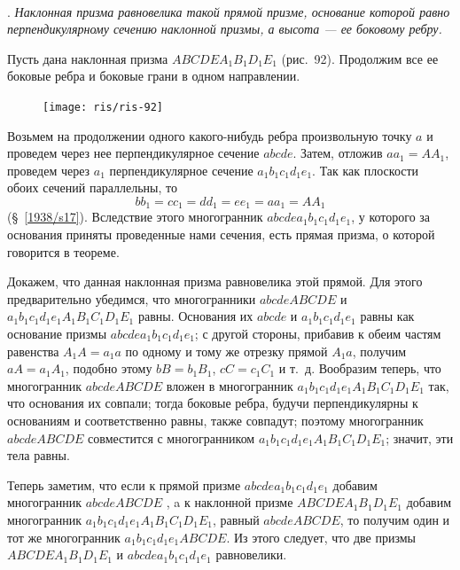 \documentclass[twoside]{book}
\begin{document}
\paragraph{}\label{1938/s86}
.
\emph{Наклонная призма равновелика такой прямой призме, основание которой равно перпендикулярному сечению наклонной призмы, а высота --- ее боковому ребру.}

Пусть дана наклонная призма $ABCDEA_1B_1D_1E_1$ (рис.~92).
Продолжим все ее боковые ребра и боковые грани в одном направлении.

\begin{figure}[h!]
\centering
\texttt{[image: ris/ris-92]}
\caption{}
\end{figure}

Возьмем на продолжении одного какого-нибудь ребра произвольную точку $a$ и проведем через нее перпендикулярное сечение $abcde$.
Затем, отложив $aa_1=AA_1$, проведем через $a_1$ перпендикулярное сечение $a_1b_1c_1d_1e_1$.
Так как плоскости обоих сечений параллельны, то 
\[bb_1=cc_1=dd_1=ee_1=aa_1=AA_1\]
(§~\ref{1938/s17}).
Вследствие этого многогранник $abcdea_1b_1c_1d_1e_1$, у которого за основания приняты проведенные нами сечения, есть прямая призма, о которой говорится в теореме.

Докажем, что данная наклонная призма равновелика этой прямой.
Для этого предварительно убедимся, что многогранники $abcdeABCDE$ и $a_1b_1c_1d_1e_1A_1B_1C_1D_1E_1$ равны.
Основания их $abcde$ и $a_1b_1c_1d_1e_1$ равны как основание призмы $abcdea_1b_1c_1d_1e_1$;
с другой стороны, прибавив к обеим частям равенства %
$A_1A=a_1a$ по одному и тому же отрезку прямой $A_1a$, получим $aA=a_1A_1$, подобно этому $bB=b_1B_1$, $cC=c_1C_1$ и т.~д.
Вообразим теперь, что многогранник $abcdeABCDE$ вложен в многогранник $a_1b_1c_1d_1e_1A_1B_1C_1D_1E_1$ так, что основания их совпали;
тогда боковые ребра, будучи перпендикулярны к основаниям и соответственно равны, также совпадут;
поэтому многогранник $abcdeABCDE$ совместится с многогранником $a_1b_1c_1d_1e_1A_1B_1C_1D_1E_1$;
значит, эти тела равны. %


Теперь заметим, что если к прямой призме $abcdea_1b_1c_1d_1e_1$ добавим многогранник $abcdeABCDE$ , a к наклонной призме $ABCDEA_1B_1D_1E_1$ добавим многогранник $a_1b_1c_1d_1e_1A_1B_1C_1D_1E_1$, равный $abcdeABCDE$, то получим один и тот же многогранник $a_1b_1c_1d_1e_1ABCDE$.
Из этого следует, что две призмы $ABCDEA_1B_1D_1E_1$ и $abcdea_1b_1c_1d_1e_1$ равновелики.
\end{document}
